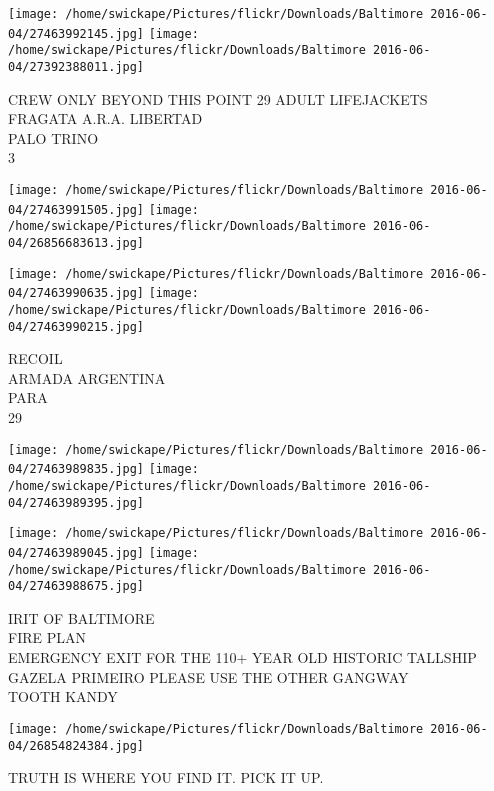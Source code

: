 \documentclass[10pt,letterpaper]{article}
\begin{document}
\texttt{[image: /home/swickape/Pictures/flickr/Downloads/Baltimore 2016-06-04/27463992145.jpg]}
\texttt{[image: /home/swickape/Pictures/flickr/Downloads/Baltimore 2016-06-04/27392388011.jpg]}

CREW ONLY BEYOND THIS POINT 29 ADULT LIFEJACKETS\\
FRAGATA A.R.A. LIBERTAD\\
PALO TRINO\\
3\\
\pagebreak

\texttt{[image: /home/swickape/Pictures/flickr/Downloads/Baltimore 2016-06-04/27463991505.jpg]}
\texttt{[image: /home/swickape/Pictures/flickr/Downloads/Baltimore 2016-06-04/26856683613.jpg]}

\texttt{[image: /home/swickape/Pictures/flickr/Downloads/Baltimore 2016-06-04/27463990635.jpg]}
\texttt{[image: /home/swickape/Pictures/flickr/Downloads/Baltimore 2016-06-04/27463990215.jpg]}

RECOIL\\
ARMADA ARGENTINA\\
PARA\\
29\\
\pagebreak

\texttt{[image: /home/swickape/Pictures/flickr/Downloads/Baltimore 2016-06-04/27463989835.jpg]}
\texttt{[image: /home/swickape/Pictures/flickr/Downloads/Baltimore 2016-06-04/27463989395.jpg]}

\texttt{[image: /home/swickape/Pictures/flickr/Downloads/Baltimore 2016-06-04/27463989045.jpg]}
\texttt{[image: /home/swickape/Pictures/flickr/Downloads/Baltimore 2016-06-04/27463988675.jpg]}

IRIT OF BALTIMORE\\
FIRE PLAN\\
EMERGENCY EXIT FOR THE 110+ YEAR OLD HISTORIC TALLSHIP GAZELA PRIMEIRO PLEASE USE THE OTHER GANGWAY\\
TOOTH KANDY\\
\pagebreak

\texttt{[image: /home/swickape/Pictures/flickr/Downloads/Baltimore 2016-06-04/26854824384.jpg]}

TRUTH IS WHERE YOU FIND IT.  PICK IT UP.\\
\pagebreak
\end{document}
